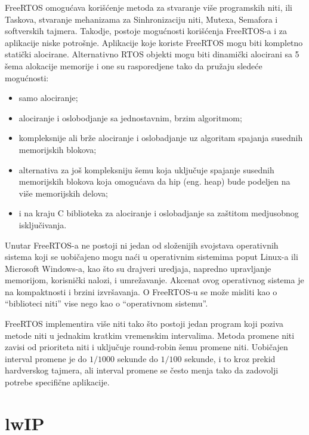 \documentclass[a4paper,12pt, master]{etf}
\begin{document}
	FreeRTOS omogu\'{c}ava kori\v{s}\'{c}enje metoda za stvaranje vi\v{s}e
	programskih niti, ili Taskova, stvaranje mehanizama za Sinhronizaciju niti,
	Mutexa, Semafora i softverskih tajmera.	Takodje, postoje mogu\'{c}nosti
	kori\v{s}\'{c}enja FreeRTOS-a i za aplikacije niske potro\v{s}nje.
	Aplikacije koje koriste FreeRTOS mogu biti kompletno stati\v{c}ki
	alocirane. Alternativno	RTOS objekti mogu biti dinami\v{c}ki alocirani sa 5
	\v{s}ema alokacije memorije i one su rasporedjene tako da pru\v{z}aju
	slede\'{c}e mogu\'{c}nosti:

	\begin{itemize}
		\item samo alociranje;
		\item alociranje i oslobodjanje sa jednostavnim, brzim algoritmom;
		\item kompleksnije ali br\v{z}e alociranje i oslobadjanje uz algoritam
            spajanja susednih memorijskih blokova;
		\item alternativa za jo\v{s} kompleksniju \v{s}emu koja uklju\v{c}uje
		    spajanje susednih memorijskih blokova koja omogu\'{c}ava da hip
            (eng\@. heap) bude podeljen na vi\v{s}e memorijskih delova;
		\item i na kraju C biblioteka za alociranje i oslobadjanje sa
    		za\v{s}titom medjusobnog isklju\v{c}ivanja.
	\end{itemize}

	Unutar FreeRTOS-a ne postoji ni jedan od slo\v{z}enijih svojstava
	operativnih sistema koji se	uobi\v{c}ajeno mogu na\'{c}i u operativnim
	sistemima poput Linux-a ili Microsoft Windows-a, kao \v{s}to su drajveri
	uredjaja, napredno upravljanje memorijom, korisni\v{c}ki nalozi, i
	umre\v{z}avanje. Akcenat ovog operativnog sistema je na kompaktnosti i
	brzini izvr\v{s}avanja. O FreeRTOS-u se mo\v{z}e misliti kao o ``biblioteci
	niti'' vise nego kao o ``operativnom sistemu''.

	FreeRTOS implementira vi\v{s}e niti tako \v{s}to postoji jedan program koji
	poziva metode niti u jednakim kratkim vremenskim intervalima. Metoda
	promene niti zavisi od prioriteta niti i uklju\v{c}uje round-robin \v{s}emu
	promene niti. Uobi\v{c}ajen interval promene je do $1/1000$ sekunde
	do $1/100$ sekunde, i to kroz prekid hardverskog tajmera, ali interval
	promene se \v{c}esto menja tako da zadovolji potrebe specifi\v{c}ne
	aplikacije.

	\section{lwIP}
\end{document}

